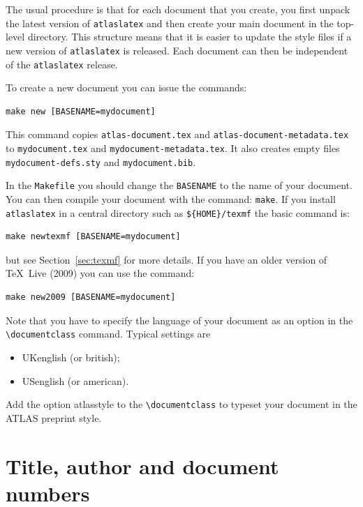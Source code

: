 \documentclass[atlasstyle,UKenglish]{latex/atlasdoc}
\newcommand{\File}[1]{\texttt{#1}\xspace}
\newcommand{\Macro}[1]{\texttt{\textbackslash #1}\xspace}
\newcommand{\Option}[1]{\textsf{#1}\xspace}
\newcommand{\Package}[1]{\texttt{#1}\xspace}
\begin{document}
The usual procedure is that for each document that you create,
you first unpack the latest version of \Package{atlaslatex} and
then create your main document in the top-level directory.
This structure means that it is easier to update the style files if a new version of
\Package{atlaslatex} is released. 
Each document can then be independent of the \Package{atlaslatex} release.

To create a new document you can issue the commands:
%
\begin{verbatim}
make new [BASENAME=mydocument]
\end{verbatim}
%
This command copies \File{atlas-document.tex} and
\File{atlas-document-metadata.tex}
to \File{mydocument.tex} and \File{mydocument-metadata.tex}.
It also creates empty files \File{mydocument-defs.sty} and \File{mydocument.bib}.

In the \File{Makefile} you should change the \texttt{BASENAME} to the name of your document.
You can then compile your document with the command: \texttt{make}.
If you install \Package{atlaslatex} in a central directory such as \File{\$\{HOME\}/texmf} the basic command is:
%
\begin{verbatim}
make newtexmf [BASENAME=mydocument]
\end{verbatim}
%
but see Section~\ref{sec:texmf} for more details.
If you have an older version of \TeX\ Live (2009) you can use the command:
%
\begin{verbatim}
make new2009 [BASENAME=mydocument]
\end{verbatim}

Note that you have to specify the language of your document as an option in the
\Macro{documentclass} command. Typical settings are
\begin{itemize}
\item UKenglish (or british);
\item USenglish (or american).
\end{itemize}

Add the option \Option{atlasstyle} to the \Macro{documentclass} to typeset your document in the ATLAS preprint style.


\section{Title, author and document numbers}
\label{sec:metadata}
\end{document}
